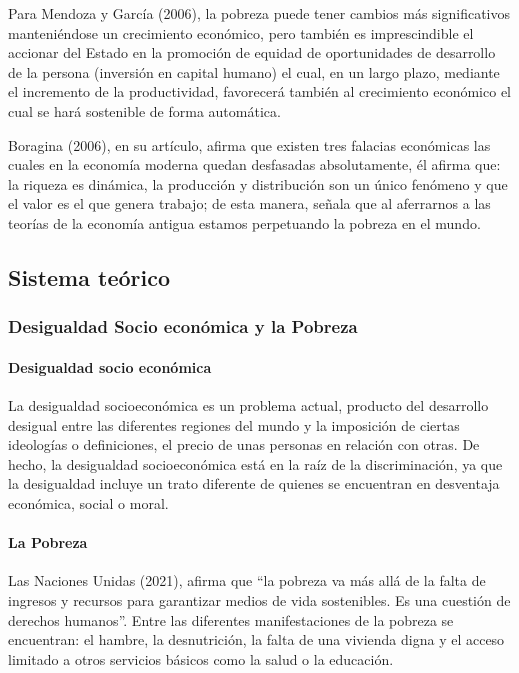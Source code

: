 Para Mendoza y García (2006), la pobreza puede tener cambios más significativos manteniéndose un crecimiento económico, pero también es imprescindible el accionar del Estado en la promoción de equidad de oportunidades de desarrollo de la persona (inversión en capital humano) el cual, en un largo plazo, mediante el incremento de la productividad, favorecerá también al crecimiento económico el cual se hará sostenible de forma automática.

Boragina (2006), en su artículo, afirma que existen tres falacias económicas las cuales en la economía moderna quedan desfasadas absolutamente, él afirma que: la riqueza es dinámica, la producción y distribución son un único fenómeno y que el valor es el que genera trabajo; de esta manera, señala que al aferrarnos a las teorías de la economía antigua estamos perpetuando la pobreza en el mundo.


\subsection{Sistema teórico}

  \subsubsection{Desigualdad Socio económica y la Pobreza}

    \paragraph{Desigualdad socio económica}
La desigualdad socioeconómica es un problema actual, producto del desarrollo desigual entre las diferentes regiones del mundo y la imposición de ciertas ideologías o definiciones, el precio de unas personas en relación con otras. De hecho, la desigualdad socioeconómica está en la raíz de la discriminación, ya que la desigualdad incluye un trato diferente de quienes se encuentran en desventaja económica, social o moral.

    \paragraph{La Pobreza}
Las Naciones Unidas (2021), afirma que “la pobreza va más allá de la falta de ingresos y recursos para garantizar medios de vida sostenibles. Es una cuestión de derechos humanos”. Entre las diferentes manifestaciones de la pobreza se encuentran: el hambre, la desnutrición, la falta de una vivienda digna y el acceso limitado a otros servicios básicos como la salud o la educación.

